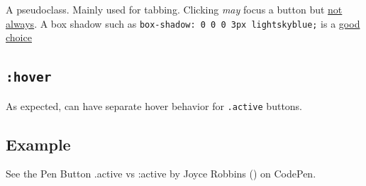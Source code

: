 \documentclass[
  openany]{book}
\begin{document}
A pseudoclass. Mainly used for tabbing. Clicking \emph{may} focus a button but \href{https://zellwk.com/blog/inconsistent-button-behavior/}{not always}. A box shadow such as \texttt{box-shadow:\ 0\ 0\ 0\ 3px\ lightskyblue;} is a \href{https://zellwk.com/blog/style-hover-focus-active-states/\#styling-focus-states}{good choice}

\hypertarget{hover}{%
\subsection{\texorpdfstring{\texttt{:hover}}{:hover}}\label{hover}}

As expected, can have separate hover behavior for \texttt{.active} buttons.

\hypertarget{example-2}{%
\subsection{Example}\label{example-2}}

{See the Pen
Button .active vs :active by Joyce Robbins (\citet{jtr13})
on CodePen.}

  
\end{document}
